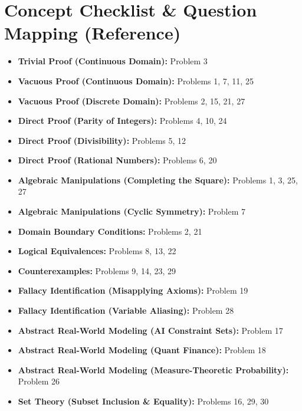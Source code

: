 \documentclass[12pt]{article}
\begin{document}
\section{Concept Checklist \& Question Mapping (Reference)}
\label{sec:checklist_end}
\begin{itemize}
    \item \textbf{Trivial Proof (Continuous Domain):} Problem 3
    \item \textbf{Vacuous Proof (Continuous Domain):} Problems 1, 7, 11, 25
    \item \textbf{Vacuous Proof (Discrete Domain):} Problems 2, 15, 21, 27
    \item \textbf{Direct Proof (Parity of Integers):} Problems 4, 10, 24
    \item \textbf{Direct Proof (Divisibility):} Problems 5, 12
    \item \textbf{Direct Proof (Rational Numbers):} Problems 6, 20
    \item \textbf{Algebraic Manipulations (Completing the Square):} Problems 1, 3, 25, 27
    \item \textbf{Algebraic Manipulations (Cyclic Symmetry):} Problem 7
    \item \textbf{Domain Boundary Conditions:} Problems 2, 21
    \item \textbf{Logical Equivalences:} Problems 8, 13, 22
    \item \textbf{Counterexamples:} Problems 9, 14, 23, 29
    \item \textbf{Fallacy Identification (Misapplying Axioms):} Problem 19
    \item \textbf{Fallacy Identification (Variable Aliasing):} Problem 28
    \item \textbf{Abstract Real-World Modeling (AI Constraint Sets):} Problem 17
    \item \textbf{Abstract Real-World Modeling (Quant Finance):} Problem 18
    \item \textbf{Abstract Real-World Modeling (Measure-Theoretic Probability):} Problem 26
    \item \textbf{Set Theory (Subset Inclusion \& Equality):} Problems 16, 29, 30
\end{itemize}
\end{document}
